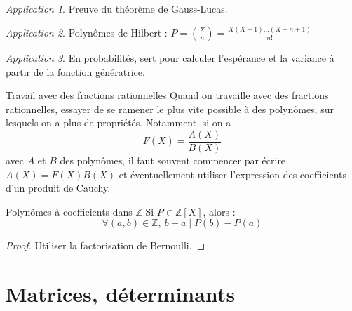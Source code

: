 \documentclass[french]{book}
\newcommand{\Z}{\mathbb{Z}}
\theoremstyle{plain}
\theoremstyle{definition}
\theoremstyle{remark}
\newtheorem*{app}{Application}
\begin{document}
\begin{app}
	Preuve du théorème de Gauss-Lucas.
\end{app}
\begin{app}
	Polynômes de Hilbert : $P=\displaystyle\binom{X}{n}=\frac{X(X-1)\ldots(X-n+1)}{n!}$
\end{app}
\begin{app}
	En probabilités, sert pour calculer l'espérance et la variance à partir de la fonction génératrice.
\end{app}
\begin{AS}{Travail avec des fractions rationnelles} Quand on travaille avec des fractions rationnelles, essayer de se ramener le plus vite possible à des polynômes, sur lesquels on a plus de propriétés. Notamment, si on a $$F(X)=\frac{A(X)}{B(X)}$$ avec $A$ et $B$ des polynômes, il faut souvent commencer par
écrire $A(X)=F(X)B(X)$ et éventuellement utiliser l’expression des coefficients
d’un produit de Cauchy.
\end{AS}
\begin{AS}{Polynômes à coefficients dans $\Z$} Si $P\in\Z[X]$, alors : $$\forall(a,b)\in\Z,\ b-a\mid P(b)-P(a)$$
\end{AS}
\begin{proof}
	Utiliser la factorisation de Bernoulli.
\end{proof}


\chapter{Matrices, déterminants}
\localtableofcontents
\end{document}
